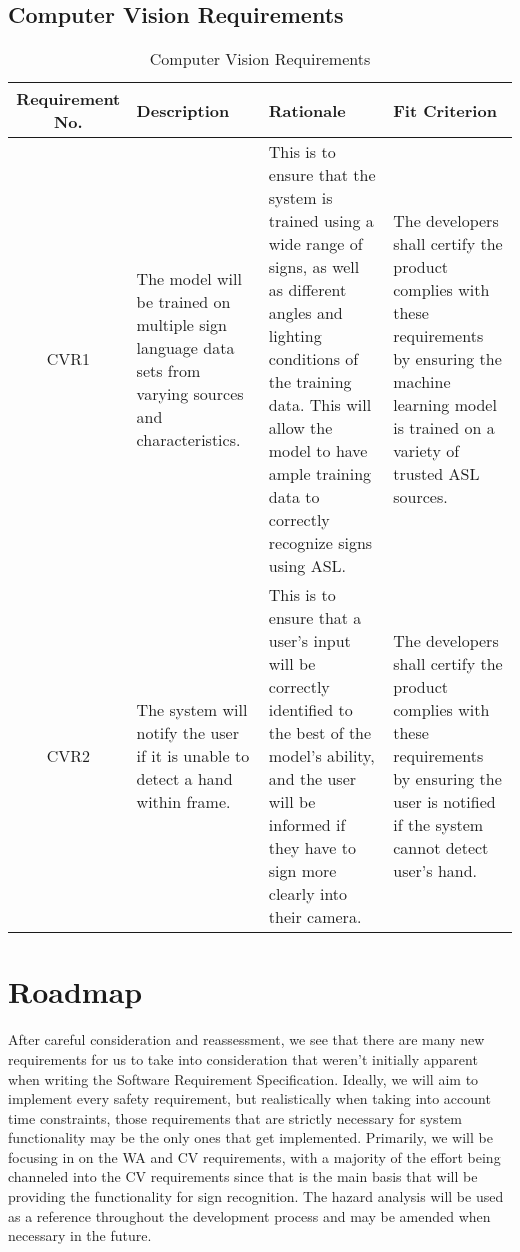\documentclass{article}
\begin{document}
\subsection{Computer Vision Requirements}

\begin{longtable}{| c | p{4cm}| p{4cm}| p{4cm}|}
    \caption{Computer Vision Requirements} \\
    \hline
    \textbf{Requirement No.} & \textbf{Description} &\textbf{Rationale} &\textbf{Fit Criterion}\\
    \hline
    CVR1 & The model will be trained on multiple sign language data sets from varying sources and characteristics. & This is to ensure that the system is trained using a wide range of signs, as well as different angles and lighting conditions of the training data. This will allow the model to have ample training data to correctly recognize signs using ASL. & The developers shall certify the product complies with these requirements by ensuring the machine learning model is trained on a variety of trusted ASL sources. \\
    \hline
    CVR2 & The system will notify the user if it is unable to detect a hand within frame. & This is to ensure that a user's input will be correctly identified to the best of the model's ability, and the user will be informed if they have to sign more clearly into their camera. & The developers shall certify the product complies with these requirements by ensuring the user is notified if the system cannot detect user's hand.\\
    \bottomrule
\end{longtable}


\section{Roadmap}

After careful consideration and reassessment, we see that there are many new requirements for us to take into consideration that weren't initially apparent when writing the Software Requirement Specification. Ideally, we will aim to implement every safety requirement, but realistically when taking into account time constraints, those requirements that are strictly necessary for system functionality may be the only ones that get implemented. Primarily, we will be focusing in on the WA and CV requirements, with a majority of the effort being channeled into the CV requirements since that is the main basis that will be providing the functionality for sign recognition. The hazard analysis will be used as a reference throughout the development process and may be amended when necessary in the future.

\end{document}
